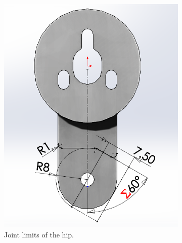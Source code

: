 \begin{figure}[ht!]
    \centering
    \begin{subfigure}[b]{0.35\textwidth}
        \includegraphics[width=\textwidth]{figures/joint_limits_hip.PNG}
        \caption{Joint limits of the hip.}
        \label{fig:joint_limits_hip}
    \end{subfigure}
    \begin{subfigure}[b]{0.35\textwidth}

\end{subfigure}
\end{figure}
